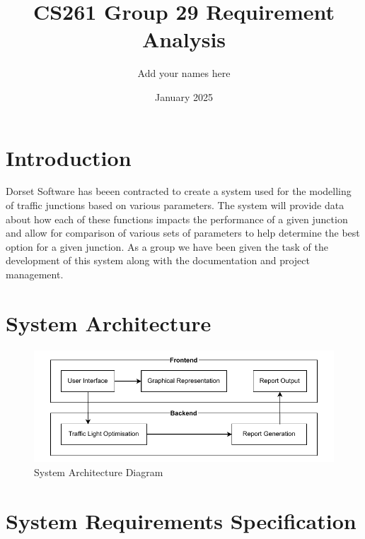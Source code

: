\documentclass{article}
\title{CS261 Group 29 Requirement Analysis}
\author{Add your names here}
\date{January 2025}
\begin{document}
\maketitle


\section{Introduction}
Dorset Software has beeen contracted to create a system used for the modelling 
of traffic junctions based on various parameters. The system will provide 
data about how each of these functions impacts the performance of a given 
junction and allow for comparison of various sets of parameters to help 
determine the best option for a given junction. As a group we have been given 
the task of the development of this system along with the documentation and 
project management.

\section{System Architecture}
\begin{figure}[H]
    \centering
    \includegraphics[width=0.5\linewidth]{System architecture.drawio.pdf}
    \caption{System Architecture Diagram}
    \label{system architecture}
\end{figure}

\section{System Requirements Specification}
\end{document}

